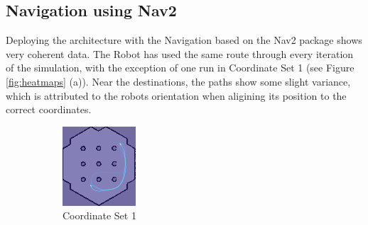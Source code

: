 \documentclass[%
paper=A4,               %
twoside=true,           %
openright,              %
11pt,                   %
bibliography=totoc,     %
titlepage=on,           %
DIV=12,                 %
BCOR=1.5cm,             %
parskip=half,            %
final
]{scrreprt}
\begin{document}
	\subsection{Navigation using Nav2}
	Deploying the architecture with the Navigation based on the Nav2 package shows very coherent data. The Robot has used the same route through every iteration of the simulation, with the exception of one run in Coordinate Set 1 (see Figure \ref{fig:heatmaps} (a)). Near the destinations, the paths show some slight variance, which is attributed to the robots orientation when aligining its position to the correct coordinates. 
	
		\begin{figure}[H]
		\centering
		\begin{subfigure}[b]{0.45\textwidth}
			\centering
			\includegraphics[width=\textwidth]{Graphics/heatmapsim1.png}
			\caption{Coordinate Set 1}
			\label{fig:fig10}
		\end{subfigure}
		\hfill
		\begin{subfigure}[b]{0.45\textwidth}
			\centering

\end{subfigure}
\end{figure}
\end{document}
